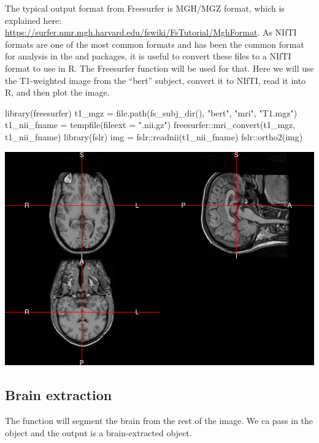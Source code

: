 The typical output format from Freesurfer is MGH/MGZ format, which is
explained here:
\url{https://surfer.nmr.mgh.harvard.edu/fswiki/FsTutorial/MghFormat}. As
NIfTI formats are one of the most common formats and has been the common
format for analysis in the  and  packages, it
is useful to convert these files to a NIfTI format to use in R. The
 Freesurfer function will be used for that. Here we
will use the T1-weighted image from the ``bert'' subject, convert it to
NIfTI, read it into R, and then plot the image.

\begin{Schunk}
\begin{Sinput}
library(freesurfer)
t1_mgz = file.path(fs_subj_dir(), "bert", "mri", "T1.mgz")
t1_nii_fname = tempfile(fileext = ".nii.gz")
freesurfer::mri_convert(t1_mgz, t1_nii_fname)
library(fslr)
img = fslr::readnii(t1_nii_fname)
fslr::ortho2(img)
\end{Sinput}

\includegraphics{Freesurfer_files/figure-latex/mri_convert-1} \end{Schunk}

\subsection{Brain extraction}\label{brain-extraction}

The  function will segment the brain from the rest
of the image. We ca pass in the  object and the output is a
brain-extracted  object.

